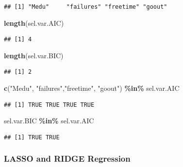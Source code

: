 \documentclass[
]{book}
\newenvironment{Shaded}{\begin{snugshade}}{\end{snugshade}}
\newcommand{\FunctionTok}[1]{\textcolor[rgb]{0.13,0.29,0.53}{\textbf{#1}}}
\newcommand{\NormalTok}[1]{#1}
\newcommand{\SpecialCharTok}[1]{\textcolor[rgb]{0.81,0.36,0.00}{\textbf{#1}}}
\newcommand{\StringTok}[1]{\textcolor[rgb]{0.31,0.60,0.02}{#1}}
\begin{document}
\begin{verbatim}
## [1] "Medu"     "failures" "freetime" "goout"
\end{verbatim}

\begin{Shaded}
\begin{Highlighting}[]
\FunctionTok{length}\NormalTok{(sel.var.AIC)}
\end{Highlighting}
\end{Shaded}

\begin{verbatim}
## [1] 4
\end{verbatim}

\begin{Shaded}
\begin{Highlighting}[]
\FunctionTok{length}\NormalTok{(sel.var.BIC)}
\end{Highlighting}
\end{Shaded}

\begin{verbatim}
## [1] 2
\end{verbatim}

\begin{Shaded}
\begin{Highlighting}[]
\FunctionTok{c}\NormalTok{(}\StringTok{"Medu"}\NormalTok{, }\StringTok{"failures"}\NormalTok{,}\StringTok{"freetime"}\NormalTok{, }\StringTok{"goout"}\NormalTok{) }\SpecialCharTok{\%in\%}\NormalTok{ sel.var.AIC}
\end{Highlighting}
\end{Shaded}

\begin{verbatim}
## [1] TRUE TRUE TRUE TRUE
\end{verbatim}

\begin{Shaded}
\begin{Highlighting}[]
\NormalTok{sel.var.BIC }\SpecialCharTok{\%in\%}\NormalTok{ sel.var.AIC}
\end{Highlighting}
\end{Shaded}

\begin{verbatim}
## [1] TRUE TRUE
\end{verbatim}

\subsubsection{LASSO and RIDGE Regression}\label{lasso-and-ridge-regression}
\end{document}

